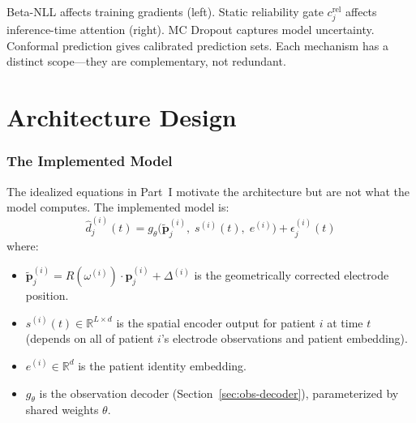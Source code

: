 \documentclass[11pt,letterpaper]{article}
\newcommand{\bfp}{\mathbf{p}}
\newcommand{\R}{\mathbb{R}}
\begin{document}
\noindent Beta-NLL affects training gradients (left). Static reliability gate $c_j^{\text{rel}}$ affects inference-time attention (right). MC Dropout captures model uncertainty. Conformal prediction gives calibrated prediction sets. Each mechanism has a distinct scope---they are complementary, not redundant.



\part{Architecture Design}

\section{The Implemented Model}\label{sec:implemented}

The idealized equations in Part~I motivate the architecture but are not what the model computes. The implemented model is:
\begin{equation}\label{eq:implemented}
\boxed{\hat{d}_j^{(i)}(t) = g_\theta\bigl(\tilde{\bfp}_j^{(i)},\; s^{(i)}(t),\; e^{(i)}\bigr) + \epsilon_j^{(i)}(t)}
\end{equation}
where:
\begin{itemize}[leftmargin=2em]
\item $\tilde{\bfp}_j^{(i)} = R(\omega^{(i)}) \cdot \bfp_j^{(i)} + \Delta^{(i)}$ is the geometrically corrected electrode position.
\item $s^{(i)}(t) \in \R^{L \times d}$ is the spatial encoder output for patient $i$ at time $t$ (depends on all of patient $i$'s electrode observations and patient embedding).
\item $e^{(i)} \in \R^d$ is the patient identity embedding.
\item $g_\theta$ is the observation decoder (Section~\ref{sec:obs-decoder}), parameterized by shared weights $\theta$.
\end{itemize}
\end{document}

